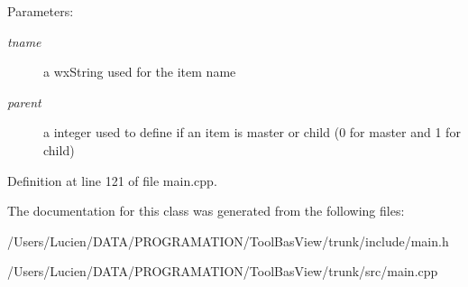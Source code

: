 \begin{Desc}
\item[Parameters:]
\begin{description}
\item[{\em tname}]a wx\-String used for the item name \item[{\em parent}]a integer used to define if an item is master or child (0 for master and 1 for child) \end{description}
\end{Desc}


Definition at line 121 of file main.cpp.

The documentation for this class was generated from the following files:\begin{CompactItemize}
\item 
/Users/Lucien/DATA/PROGRAMATION/Tool\-Bas\-View/trunk/include/main.h\item 
/Users/Lucien/DATA/PROGRAMATION/Tool\-Bas\-View/trunk/src/main.cpp\end{CompactItemize}
